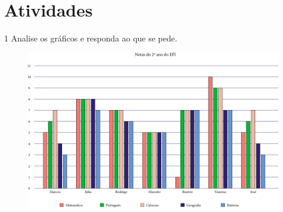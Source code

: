 \section*{Atividades}

\num{1} Analise os gráficos e responda ao que se pede.

\begin{figure}[htpb!]
\centering
\includegraphics[width=\textwidth]{./media/image90.png}
\end{figure}

